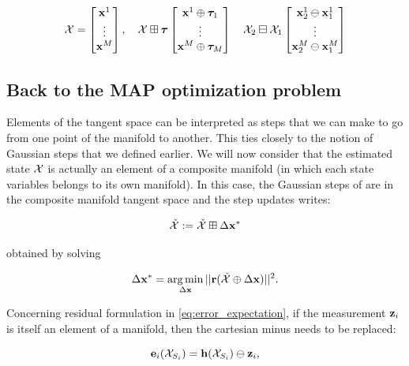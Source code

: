 \begin{equation}
    \mathcal{X}=
    \begin{bmatrix}
        {\bf x}^1 \\
        \vdots \\
        {\bf x}^M
    \end{bmatrix},
    \quad
    \mathcal{X} \boxplus {\bm \tau}
    \begin{bmatrix}
        {\bf x}^1 \oplus {\bm \tau}_1 \\
        \vdots \\
        {\bf x}^M \oplus {\bm \tau}_M
    \end{bmatrix}
    \quad
    \mathcal{X}_2 \boxminus \mathcal{X}_1
    \begin{bmatrix}
        {\bf x}^1_2 \ominus {\bf x}^1_1 \\
        \vdots \\
        {\bf x}^M_2 \ominus {\bf x}^M_1
    \end{bmatrix}
\end{equation}



\subsection{Back to the MAP optimization problem}
Elements of the tangent space can be interpreted as steps that we can make to go from one point of the manifold to another.
This ties closely to the notion of Gaussian steps that we defined earlier. We will now consider that the estimated state $\mathcal{X}$
is actually an element of a composite manifold (in which each state variables belongs to its own manifold). In this case, the Gaussian steps of 
are in the composite manifold tangent space and the step updates writes:

\begin{equation}
    \check{\mathcal{X}} := \check{\mathcal{X}} \boxplus \Delta {\bf x}^*
\end{equation}

obtained by solving

\begin{equation}
    \Delta {\bf x}^* = \operatorname*{arg\,min}_{\Delta {\bf x}} ||{\bf r}(\check{\mathcal{X}} \oplus \Delta {\bf x})||^2.
\end{equation}


Concerning residual formulation in \ref{eq:error_expectation}, if the measurement ${\bf z}_i$ is itself an element of a manifold, then the cartesian minus needs to be replaced:

\begin{equation}
    {\bf e}_i(\mathcal{X}_{S_i}) = {\bf h}(\mathcal{X}_{S_i}) \ominus {\bf z}_i,
    \label{eq:error_expectation}
\end{equation}

